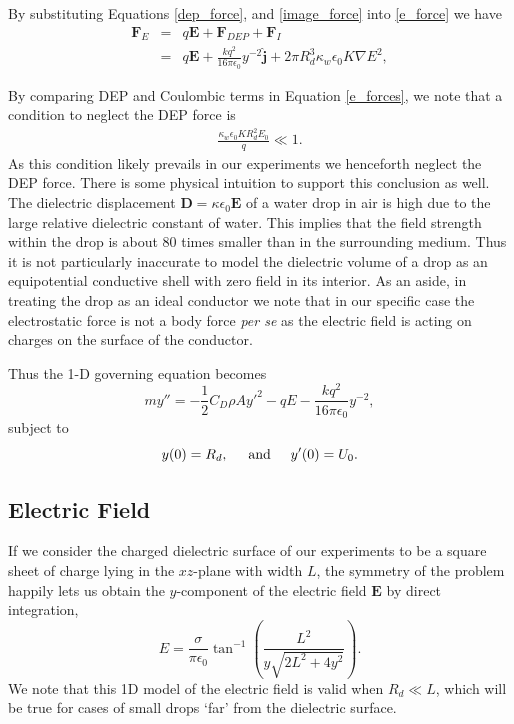 \documentclass[aip,reprint, floatfix]{revtex4-1}
\begin{document}
By substituting Equations \ref{dep_force}, and \ref{image_force} into \ref{e_force} we have
\begin{eqnarray*}
 \mathbf{F}_E &=& q \mathbf{E} + \mathbf{F}_{DEP} + \mathbf{F}_I \\
 &=& q \mathbf{E} + \frac{k q^2}{16 \pi \epsilon_0 } y^{-2} \hat{\mathbf{j}} + 2 \pi R_d^3 \kappa_w \epsilon_0 K \nabla E^2, 
 \label{e_forces}
\end{eqnarray*}

By comparing DEP and Coulombic terms in Equation \ref{e_forces}, we note that a condition to neglect the DEP force is
\begin{eqnarray}
\frac{ \kappa_w \epsilon_0 K R_d^2 E_0}{q} \ll 1. \nonumber
\end{eqnarray}
As this condition likely prevails in our experiments we henceforth neglect the DEP force. There is some physical intuition to support this conclusion as well. The dielectric displacement $\mathbf{D} = \kappa \epsilon_0 \mathbf{E}$ of a water drop in air is high due to the large relative dielectric constant of water. This implies that the field strength within the drop is about 80 times smaller than in the surrounding medium. Thus it is not particularly inaccurate to model the dielectric volume of a drop as an equipotential conductive shell with zero field in its interior. As an aside, in treating the drop as an ideal conductor we note that in our specific case the electrostatic force is not a body force \emph{per se} as the electric field is acting on charges on the surface of the conductor.

Thus the 1-D governing equation becomes
\begin{equation}
 \label{gov_eqn_subs}
m y'' = - \frac{1}{2} C_D \rho A {y'}^2 - q E - \frac{k q^2}{16 \pi \epsilon_0} y^{-2},
\end{equation}
subject to
\begin{equation}
y(0) = R_d, \hspace{5 mm} \mbox{and} \hspace{5 mm} y'(0) = U_0 .
\end{equation}

\subsection{Electric Field}
If we consider the charged dielectric surface of our experiments to be a square sheet of charge lying in the $xz$-plane with width $L$, the symmetry of the problem happily lets us obtain the $y$-component of the electric field $\mathbf{E}$ by direct integration,
\begin{equation}
\label{e_field}
E = \frac{\sigma}{ \pi \epsilon_0} \tan^{-1} \left( \frac{L^2}{y \sqrt{2L^2 + 4y^2}}\right)
.\end{equation}
We note that this 1D model of the electric field is valid when $R_d \ll L$, which will be true for cases of small drops `far' from the dielectric surface. 
\end{document}
